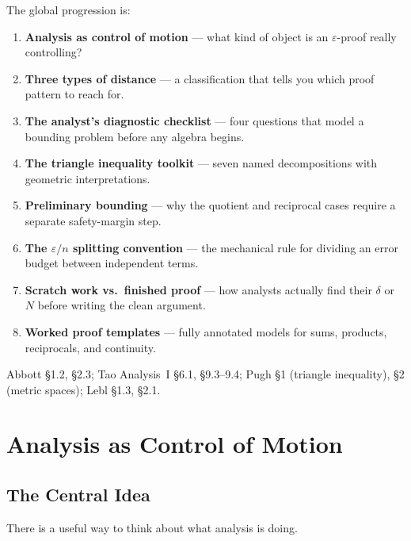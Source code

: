 The global progression is:
\begin{enumerate}
  \item \textbf{Analysis as control of motion} — what kind of object
        is an $\varepsilon$-proof really controlling?
  \item \textbf{Three types of distance} — a classification that tells
        you which proof pattern to reach for.
  \item \textbf{The analyst's diagnostic checklist} — four questions
        that model a bounding problem before any algebra begins.
  \item \textbf{The triangle inequality toolkit} — seven named
        decompositions with geometric interpretations.
  \item \textbf{Preliminary bounding} — why the quotient and reciprocal
        cases require a separate safety-margin step.
  \item \textbf{The $\varepsilon/n$ splitting convention} — the
        mechanical rule for dividing an error budget between independent terms.
  \item \textbf{Scratch work vs.\ finished proof} — how analysts actually
        find their $\delta$ or $N$ before writing the clean argument.
  \item \textbf{Worked proof templates} — fully annotated models for sums,
        products, reciprocals, and continuity.
\end{enumerate}

\begin{remark*}
Abbott \S1.2, \S2.3; Tao Analysis~I \S6.1, \S9.3--9.4;
Pugh \S1 (triangle inequality), \S2 (metric spaces);
Lebl \S1.3, \S2.1.
\end{remark*}

\clearpage


\section{Analysis as Control of Motion}
\label{sec:analysis-as-control}

\subsection{The Central Idea}

There is a useful way to think about what analysis is doing.

